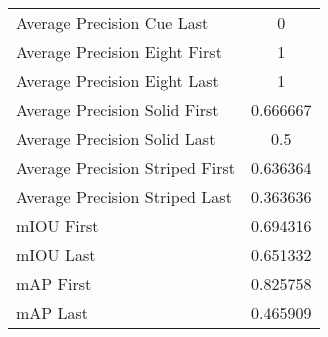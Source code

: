 \begin{figure}
\begin{subfigure}[b]{0.49\textwidth}
\begin{tabular}{|l|c|}
        Average Precision Cue Last & 0 \\
        Average Precision Eight First & 1 \\
        Average Precision Eight Last & 1 \\
        Average Precision Solid First & 0.666667 \\
        Average Precision Solid Last & 0.5 \\
        Average Precision Striped First & 0.636364 \\
        Average Precision Striped Last & 0.363636 \\
        \hline
        mIOU First & 0.694316 \\
        mIOU Last & 0.651332 \\
        mAP First & 0.825758 \\
        mAP Last & 0.465909 \\
        \hline
    \end{tabular}    
\end{subfigure}
\end{figure}


